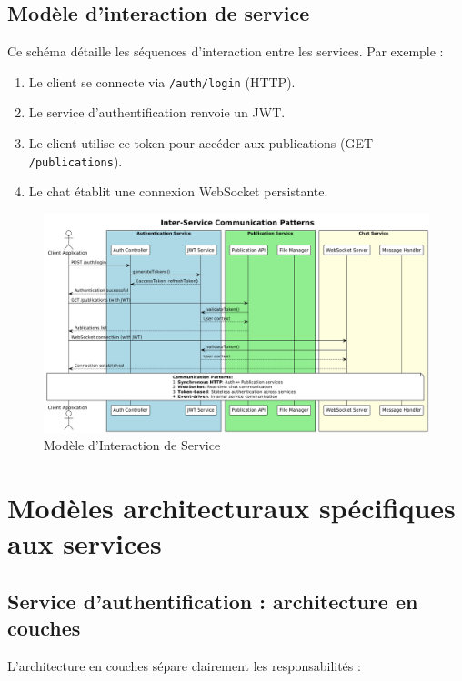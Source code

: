 \documentclass{rapportPfe}
\begin{document}
\FloatBarrier
\subsection{Modèle d'interaction de service}

Ce schéma détaille les séquences d’interaction entre les services. Par exemple :

\begin{enumerate}
    \item Le client se connecte via \texttt{/auth/login} (HTTP).
    \item Le service d’authentification renvoie un JWT.
    \item Le client utilise ce token pour accéder aux publications (GET \texttt{/publications}).
    \item Le chat établit une connexion WebSocket persistante.
\end{enumerate}

\begin{figure}[htbp]
    \centering
    \includegraphics[width=1.1\textwidth]{diagrams/diagram1.png}
    \caption{Modèle d’Interaction de Service}
    \label{fig:diagram1}
\end{figure}

\newpage
\FloatBarrier

\section{Modèles architecturaux spécifiques aux services}

\subsection{Service d’authentification : architecture en couches}
L’architecture en couches sépare clairement les responsabilités :
\end{document}
